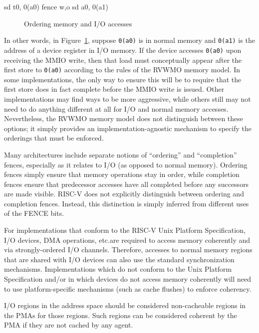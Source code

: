 \begin{verbbox}
  sd t0, 0(a0)
  fence w,o
  sd a0, 0(a1)
\end{verbbox}
\begin{figure}[h!]
  \centering\small
  \theverbbox
  \caption{Ordering memory and I/O accesses}
  \label{fig:litmus:wo}
\end{figure}

In other words, in Figure~\ref{fig:litmus:wo}, suppose {\tt 0(a0)} is in normal memory and {\tt 0(a1)} is the address of a device register in I/O memory.
If the device accesses {\tt 0(a0)} upon receiving the MMIO write, then that load must conceptually appear after the first store to {\tt 0(a0)} according to the rules of the RVWMO memory model.
In some implementations, the only way to ensure this will be to require that the first store does in fact complete before the MMIO write is issued.
Other implementations may find ways to be more aggressive, while others still may not need to do anything different at all for I/O and normal memory accesses.
Nevertheless, the RVWMO memory model does not distinguish between these options; it simply provides an implementation-agnostic mechanism to specify the orderings that must be enforced.

Many architectures include separate notions of ``ordering'' and ``completion'' fences, especially as it relates to I/O (as opposed to normal memory).
Ordering fences simply ensure that memory operations stay in order, while completion fences ensure that predecessor accesses have all completed before any successors are made visible.
RISC-V does not explicitly distinguish between ordering and completion fences.
Instead, this distinction is simply inferred from different uses of the FENCE bits.

For implementations that conform to the RISC-V Unix Platform Specification, I/O devices, DMA operations, etc.\@ are required to access memory coherently and via strongly-ordered I/O channels.
Therefore, accesses to normal memory regions that are shared with I/O devices can also use the standard synchronization mechanisms.
Implementations which do not conform to the Unix Platform Specification and/or in which devices do not access memory coherently will need to use platform-specific mechanisms (such as cache flushes) to enforce coherency.

I/O regions in the address space should be considered non-cacheable regions in the PMAs for those regions.  Such regions can be considered coherent by the PMA if they are not cached by any agent.


